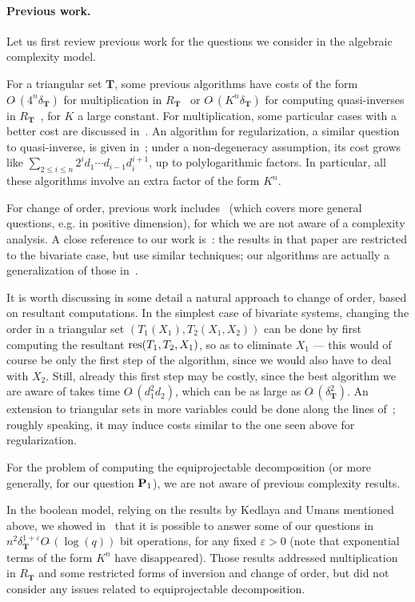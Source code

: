 \documentclass[12pt]{article}
\def\Tt {\ensuremath{\mathbf{T}}}
\def\Ot {O\tilde{~}}
\begin{document}
\paragraph{Previous work.}
Let us first review previous work for the questions we consider in the
algebraic complexity model.

For a triangular set $\Tt$, some previous algorithms have costs of the
form $\Ot(4^n \delta_\Tt)$ for multiplication in
$R_\Tt$~\cite{LiMoSc09} or $\Ot(K^n \delta_\Tt)$ for computing
quasi-inverses in $R_\Tt$~\cite{DaMoScXi06}, for $K$ a large
constant. For multiplication, some particular cases with a better
cost are discussed in~\cite{BoChHoSc09}. An algorithm for
regularization, a similar question to quasi-inverse, is given
in~\cite{LiMoPa09,LiMoPa10}; under a non-degeneracy assumption, its
cost grows like $\sum_{2\le i\le n}2^id_1 \cdots d_{i-1}d_i^{i+1}$, up
to polylogarithmic factors. In particular, all these algorithms
involve an extra factor of the form $K^n$.

For change of order, previous work includes~\cite{BoLeMo01} (which
covers more general questions, e.g. in positive dimension), for which
we are not aware of a complexity analysis. A close reference to our
work is~\cite{PaSc06}: the results in that paper are restricted to the
bivariate case, but use similar techniques; our algorithms are
actually a generalization of those in~\cite{PaSc06}. 

It is worth discussing in some detail a natural approach to change of
order, based on resultant computations. In the simplest case of
bivariate systems, changing the order in a triangular set
$(T_1(X_1),T_2(X_1,X_2))$ can be done by first computing the resultant
${\rm res}(T_1,T_2,X_1)$, so as to eliminate $X_1$ --- this would of
course be only the first step of the algorithm, since we would also
have to deal with $X_2$. Still, already this first step may be costly,
since the best algorithm we are aware of takes time
$O\tilde{~}(d_1^2d_2)$, which can be as large as
$O\tilde{~}(\delta_\Tt^2)$. An extension to triangular sets in more
variables could be done along the lines of~\cite{LiMoPa09,LiMoPa10};
roughly speaking, it may induce costs similar to the one seen above
for regularization.

For the problem of computing the equiprojectable decomposition (or
more generally, for our question ${\bf P}_1$), we are not aware of
previous complexity results.

In the boolean model, relying on the results by Kedlaya and Umans
mentioned above, we showed in~\cite{PoSc10} that it is possible to
answer some of our questions in $n^2
\delta_\Tt^{1+\varepsilon}\Ot(\log(q))$ bit operations, for any fixed
$\varepsilon > 0$ (note that exponential terms of the form $K^n$ have
disappeared).  Those results addressed multiplication in $R_\Tt$ and
some restricted forms of inversion and change of order, but did not
consider any issues related to equiprojectable decomposition.
\end{document}
